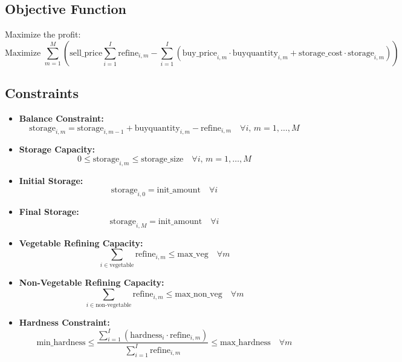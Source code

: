 \documentclass{article}
\begin{document}
\subsection*{Objective Function}
Maximize the profit:
\[
\text{Maximize } \sum_{m=1}^{M} \left( \text{sell\_price} \sum_{i=1}^{I} \text{refine}_{i,m} - \sum_{i=1}^{I} \left( \text{buy\_price}_{i,m} \cdot \text{buyquantity}_{i,m} + \text{storage\_cost} \cdot \text{storage}_{i,m} \right) \right)
\]

\subsection*{Constraints}
\begin{itemize}
    \item \textbf{Balance Constraint: }
    \[
    \text{storage}_{i,m} = \text{storage}_{i,m-1} + \text{buyquantity}_{i,m} - \text{refine}_{i,m} \quad \forall i, \, m = 1, \dots, M
    \]
    \item \textbf{Storage Capacity: }
    \[
    0 \leq \text{storage}_{i,m} \leq \text{storage\_size} \quad \forall i, \, m = 1, \dots, M
    \]
    \item \textbf{Initial Storage: }
    \[
    \text{storage}_{i,0} = \text{init\_amount} \quad \forall i
    \]
    \item \textbf{Final Storage: }
    \[
    \text{storage}_{i,M} = \text{init\_amount} \quad \forall i
    \]
    \item \textbf{Vegetable Refining Capacity: }
    \[
    \sum_{i \in \text{vegetable}} \text{refine}_{i,m} \leq \text{max\_veg} \quad \forall m
    \]
    \item \textbf{Non-Vegetable Refining Capacity: }
    \[
    \sum_{i \in \text{non-vegetable}} \text{refine}_{i,m} \leq \text{max\_non\_veg} \quad \forall m
    \]
    \item \textbf{Hardness Constraint: }
    \[
    \text{min\_hardness} \leq \frac{\sum_{i=1}^{I} \left(\text{hardness}_{i} \cdot \text{refine}_{i,m}\right)}{\sum_{i=1}^{I} \text{refine}_{i,m}} \leq \text{max\_hardness} \quad \forall m
    \]
\end{itemize}
\end{document}
